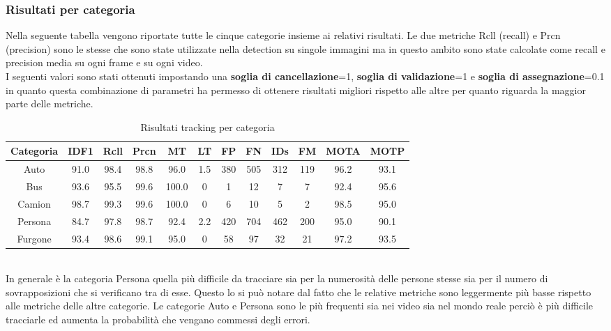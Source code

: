 \subsubsection{Risultati per categoria}
Nella seguente tabella vengono riportate tutte le cinque categorie insieme ai relativi risultati. Le due metriche Rcll (recall) e Prcn (precision) sono le stesse che sono state utilizzate nella detection su singole immagini ma in questo ambito sono state calcolate come recall e precision media su ogni frame e su ogni video.\\
I seguenti valori sono stati ottenuti impostando una \textbf{soglia di cancellazione}=1, \textbf{soglia di validazione}=1 e \textbf{soglia di assegnazione}=0.1 in quanto questa combinazione di parametri ha permesso di ottenere risultati migliori rispetto alle altre per quanto riguarda la maggior parte delle metriche.
\begin{table}[h!]
\centering
\begin{tabular}{|c|c|c|c|c|c|c|c|c|c|c|c|} 
\hline
Categoria & IDF1 & Rcll & Prcn & MT & LT & FP & FN & IDs & FM & MOTA & MOTP\\ [0.5ex] 
\hline
Auto & 91.0 & 98.4 & 98.8 & 96.0 & 1.5 & 380 & 505 & 312 & 119 & 96.2 & 93.1 \\
Bus & 93.6 & 95.5 & 99.6 & 100.0 & 0 & 1 & 12 & 7 & 7 & 92.4 & 95.6 \\
Camion & 98.7 & 99.3 & 99.6 & 100.0 & 0 & 6 & 10 & 5 & 2 & 98.5 & 95.0 \\
Persona & 84.7 & 97.8 & 98.7 & 92.4 & 2.2 & 420 & 704 & 462 & 200 & 95.0 & 90.1 \\
Furgone & 93.4 & 98.6 & 99.1 & 95.0 & 0 & 58 & 97 & 32 & 21 & 97.2 & 93.5\\
\hline
\end{tabular}
\caption{Risultati tracking per categoria}
\label{risultati tracking categoria}
\end{table}
\\
In generale è la categoria Persona quella più difficile da tracciare sia per la numerosità delle persone stesse sia per il numero di sovrapposizioni che si verificano tra di esse. Questo lo si può notare dal fatto che le relative metriche sono leggermente più basse rispetto alle metriche delle altre categorie. Le categorie Auto e Persona sono le più frequenti sia nei video sia nel mondo reale perciò è più difficile tracciarle ed aumenta la probabilità che vengano commessi degli errori.

\clearpage
